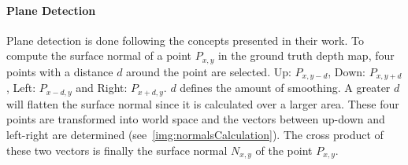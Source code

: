 \paragraph{Plane Detection} 
Plane detection is done following the concepts \textcite{Yoo:2013he} presented in their work. To compute the surface normal of a point $P_{x,y}$ in the ground truth depth map, four points with a distance $d$ around the point are selected. Up: $P_{x,y-d}$, Down: $P_{x,y+d}$, Left: $P_{x-d,y}$ and Right: $P_{x+d,y}$. $d$ defines the amount of smoothing. A greater $d$ will flatten the surface normal since it is calculated over a larger area. These four points are transformed into world space and the vectors between up-down and left-right are determined (see~\autoref{img:normalsCalculation}). The cross product of these two vectors is finally the surface normal $N_{x,y}$ of the point $P_{x,y}$.

